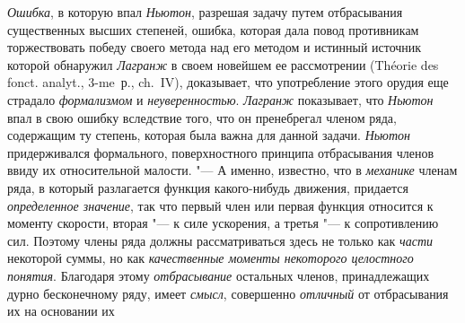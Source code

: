 {\em Ошибка}, в которую впал
{\em Ньютон}, разрешая задачу путем отбрасывания
существенных высших степеней, ошибка, которая дала повод противникам
торжествовать победу своего метода над его методом и истинный источник
которой обнаружил {\em Лагранж} в своем новейшем ее рассмотрении
(Théorie des fonct. analyt., 3-me~р., ch.~IV),
доказывает, что употребление этого орудия еще страдало
{\em формализмом} и {\em неуверенностью}. {\em Лагранж}
показывает, что {\em Ньютон} впал в свою ошибку
вследствие того, что он пренебрегал членом ряда, содержащим ту степень,
которая была важна для данной задачи. {\em Ньютон}
придерживался формального, поверхностного принципа отбрасывания членов
ввиду их относительной малости. "--- А именно, известно, что в
{\em механике} членам ряда, в который разлагается
функция какого-нибудь движения, придается
{\em определенное значение}, так что первый член или
первая функция относится к моменту скорости, вторая "--- к силе ускорения, а
третья "--- к сопротивлению сил. Поэтому члены ряда должны рассматриваться
здесь не только как {\em части} некоторой суммы, но как
{\em качественные моменты некоторого целостного
понятия}. Благодаря этому {\em отбрасывание} остальных
членов, принадлежащих дурно бесконечному ряду, имеет
{\em смысл}, совершенно
{\em отличный} от отбрасывания их на основании их

